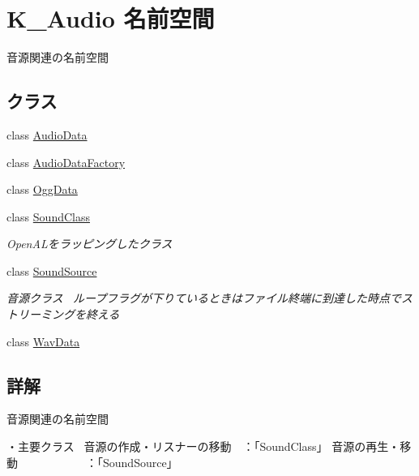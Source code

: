 \hypertarget{namespace_k___audio}{}\section{K\+\_\+\+Audio 名前空間}
\label{namespace_k___audio}


音源関連の名前空間  


\subsection*{クラス}
\begin{DoxyCompactItemize}
\item 
class \mbox{\hyperlink{class_k___audio_1_1_audio_data}{Audio\+Data}}
\item 
class \mbox{\hyperlink{class_k___audio_1_1_audio_data_factory}{Audio\+Data\+Factory}}
\item 
class \mbox{\hyperlink{class_k___audio_1_1_ogg_data}{Ogg\+Data}}
\item 
class \mbox{\hyperlink{class_k___audio_1_1_sound_class}{Sound\+Class}}
\begin{DoxyCompactList}\small\item\em Open\+A\+Lをラッピングしたクラス \end{DoxyCompactList}\item 
class \mbox{\hyperlink{class_k___audio_1_1_sound_source}{Sound\+Source}}
\begin{DoxyCompactList}\small\item\em 音源クラス~\newline
ループフラグが下りているときはファイル終端に到達した時点でストリーミングを終える \end{DoxyCompactList}\item 
class \mbox{\hyperlink{class_k___audio_1_1_wav_data}{Wav\+Data}}
\end{DoxyCompactItemize}


\subsection{詳解}
音源関連の名前空間 

・主要クラス~\newline
音源の作成・リスナーの移動　：「\+Sound\+Class」 音源の再生・移動　　　　　　：「\+Sound\+Source」 